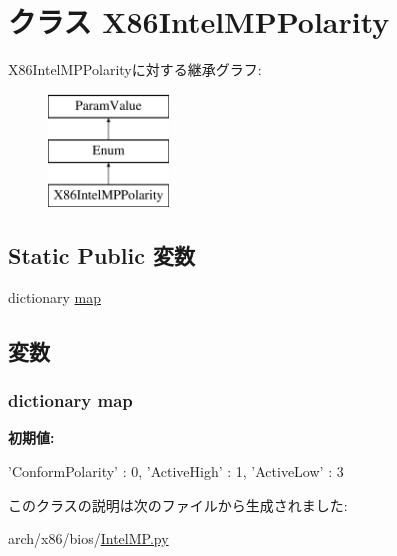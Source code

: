 \hypertarget{classIntelMP_1_1X86IntelMPPolarity}{
\section{クラス X86IntelMPPolarity}
\label{classIntelMP_1_1X86IntelMPPolarity}
}
X86IntelMPPolarityに対する継承グラフ:\begin{figure}[H]
\begin{center}
\leavevmode
\includegraphics[height=3cm]{classIntelMP_1_1X86IntelMPPolarity}
\end{center}
\end{figure}
\subsection*{Static Public 変数}
\begin{DoxyCompactItemize}
\item 
dictionary \hyperlink{classIntelMP_1_1X86IntelMPPolarity_aca70ca58dda85cf4fe7a0737ec18e004}{map}
\end{DoxyCompactItemize}


\subsection{変数}
\hypertarget{classIntelMP_1_1X86IntelMPPolarity_aca70ca58dda85cf4fe7a0737ec18e004}{
\subsubsection[{map}]{\setlength{\rightskip}{0pt plus 5cm}dictionary {\bf map}}}
\label{classIntelMP_1_1X86IntelMPPolarity_aca70ca58dda85cf4fe7a0737ec18e004}
{\bfseries 初期値:}
\begin{DoxyCode}
{'ConformPolarity' : 0,
           'ActiveHigh' : 1,
           'ActiveLow' : 3
    }
\end{DoxyCode}


このクラスの説明は次のファイルから生成されました:\begin{DoxyCompactItemize}
\item 
arch/x86/bios/\hyperlink{IntelMP_8py}{IntelMP.py}\end{DoxyCompactItemize}
